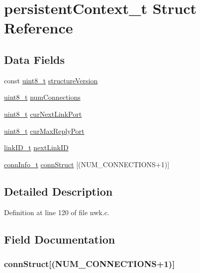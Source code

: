 \hypertarget{structpersistentContext__t}{\section{persistent\-Context\-\_\-t \-Struct \-Reference}
\label{structpersistentContext__t}
}
\subsection*{\-Data \-Fields}
\begin{DoxyCompactItemize}
\item 
const \hyperlink{bsp__msp430__defs_8h_aba7bc1797add20fe3efdf37ced1182c5}{uint8\-\_\-t} \hyperlink{structpersistentContext__t_abaeac73e5d38f919c1377241bb5ad908}{structure\-Version}
\item 
\hyperlink{bsp__msp430__defs_8h_aba7bc1797add20fe3efdf37ced1182c5}{uint8\-\_\-t} \hyperlink{structpersistentContext__t_aa20fc5a3af31c0a5693f20b28d8e1d8b}{num\-Connections}
\item 
\hyperlink{bsp__msp430__defs_8h_aba7bc1797add20fe3efdf37ced1182c5}{uint8\-\_\-t} \hyperlink{structpersistentContext__t_a4cbb01bbc17e0c2207524496da8f9f90}{cur\-Next\-Link\-Port}
\item 
\hyperlink{bsp__msp430__defs_8h_aba7bc1797add20fe3efdf37ced1182c5}{uint8\-\_\-t} \hyperlink{structpersistentContext__t_afe9a40f4f243b11179138d8bb0a3a78e}{cur\-Max\-Reply\-Port}
\item 
\hyperlink{nwk__types_8h_a542d45d12faba7ae8fd0c989ef2c8528}{link\-I\-D\-\_\-t} \hyperlink{structpersistentContext__t_a890eda1dd82d222e844616605cb9e167}{next\-Link\-I\-D}
\item 
\hyperlink{structconnInfo__t}{conn\-Info\-\_\-t} \hyperlink{structpersistentContext__t_a7e3a4a01e4ba0498a50955df52f1fd19}{conn\-Struct} \mbox{[}(\-N\-U\-M\-\_\-\-C\-O\-N\-N\-E\-C\-T\-I\-O\-N\-S+1)\mbox{]}
\end{DoxyCompactItemize}


\subsection{\-Detailed \-Description}


\-Definition at line 120 of file nwk.\-c.



\subsection{\-Field \-Documentation}
\hypertarget{structpersistentContext__t_a7e3a4a01e4ba0498a50955df52f1fd19}{
\subsubsection[{conn\-Struct}]{ {\bf conn\-Struct}\mbox{[}(\-N\-U\-M\-\_\-\-C\-O\-N\-N\-E\-C\-T\-I\-O\-N\-S+1)\mbox{]}}}\label{structpersistentContext__t_a7e3a4a01e4ba0498a50955df52f1fd19}


